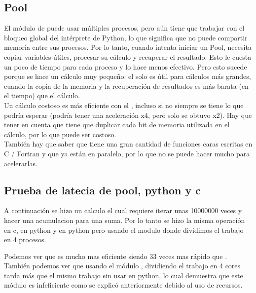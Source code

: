 \subsection{Pool}
    El módulo de  puede usar múltiples procesos, pero aún
    tiene que trabajar con el bloqueo global del intérprete de Python, lo que
    significa que no puede compartir memoria entre sus procesos. Por lo tanto,
    cuando intenta iniciar un Pool, necesita copiar variables útiles, procesar
    su cálculo y recuperar el resultado. Esto le cuesta un poco de tiempo para
    cada proceso y lo hace menos efectivo. Pero esto sucede porque se hace
    un cálculo muy pequeño: el  solo es útil para cálculos
    más grandes, cuando la copia de la memoria y la recuperación de resultados
    es más barata (en el tiempo) que el cálculo.\\

    Un cálculo costoso es más eficiente con el , incluso
    si no siempre se tiene lo que podría esperar (podría tener una aceleración x4,
    pero solo se obtuvo x2). Hay que tener en cuenta que  tiene que
    duplicar cada bit de memoria utilizada en el cálculo, por lo que puede ser
    costoso.\\
    También hay que saber que  tiene una gran cantidad de funciones
    caras escritas en C / Fortran y que ya están en paralelo, por lo que no
    se puede hacer mucho para acelerarlas.
\subsection{Prueba de latecia de pool, python y c}
    A continuación se hizo un calculo el cual requiere iterar unas 10000000 veces
    y hacer una acumulacion para una suma. Por lo tanto se hizo la misma operación
    en c, en python y en python pero usando el modulo  donde dividimos el
    trabajo en 4 procesos.
    \def\text{tiempos de la pruebas en segundos}
    \def\path{test_pool.png}
    \def\scale{.6}
    
    Podemos ver que  es mucho mas eficiente siendo 33 veces mas rápido que
    . También podemos ver que usando el módulo , dividiendo
    el trabajo en 4 cores tarda más que el mismo trabajo sin usar 
    en python, lo cual demuestra que este módulo es infeficiente como se explicó
    anteriormente debido al uso de recursos.
